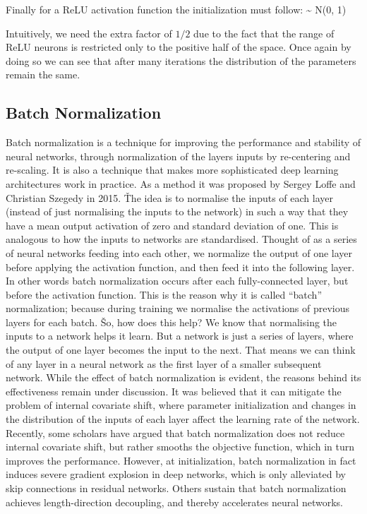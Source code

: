 Finally for a ReLU activation function the initialization must follow:
\bse
\theta \sim {} N(0, 1)
\ese

Intuitively, we need the extra factor of $1/2$ due to the fact that the range of ReLU neurons is restricted only to 
the positive half of the space. Once again by doing so we can see that after many iterations the distribution of the 
parameters remain the same.


\subsection{Batch Normalization}

Batch normalization is a technique for improving the performance and stability of neural networks, through 
normalization of the layers inputs by re-centering and re-scaling. It is also a technique that makes more 
sophisticated deep learning architectures work in practice. As a method it was proposed by Sergey Loffe and Christian
Szegedy in 2015. \v

The idea is to normalise the inputs of each layer (instead of just normalising the inputs to the network) in such a 
way that they have a mean output activation of zero and standard deviation of one. This is analogous to how the 
inputs to networks are standardised. Thought of as a series of neural networks feeding into each other, we normalize 
the output of one layer before applying the activation function, and then feed it into the following layer. In other 
words batch normalization occurs after each fully-connected layer, but before the activation function. This is the 
reason why it is called ``batch'' normalization; because during training we normalise the activations of previous 
layers for each batch. \v

So, how does this help? We know that normalising the inputs to a network helps it learn. But a network is just a 
series of layers, where the output of one layer becomes the input to the next. That means we can think of any layer 
in a neural network as the first layer of a smaller subsequent network. While the effect of batch normalization is 
evident, the reasons behind its effectiveness remain under discussion. It was believed that it can mitigate the 
problem of internal covariate shift, where parameter initialization and changes in the distribution of the inputs of 
each layer affect the learning rate of the network. Recently, some scholars have argued that batch normalization does
not reduce internal covariate shift, but rather smooths the objective function, which in turn improves the 
performance. However, at initialization, batch normalization in fact induces severe gradient explosion in deep 
networks, which is only alleviated by skip connections in residual networks. Others sustain that batch normalization
achieves length-direction decoupling, and thereby accelerates neural networks.

